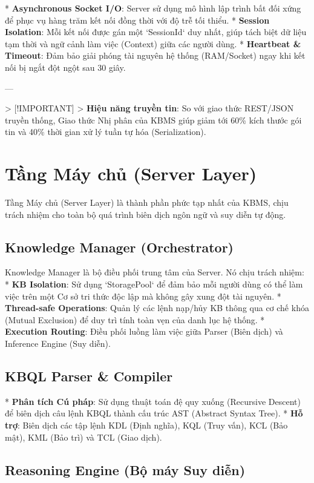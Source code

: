 *   \textbf{Asynchronous Socket I/O}: Server sử dụng mô hình lập trình bất đối xứng để phục vụ hàng trăm kết nối đồng thời với độ trễ tối thiểu.
*   \textbf{Session Isolation}: Mỗi kết nối được gán một `SessionId` duy nhất, giúp tách biệt dữ liệu tạm thời và ngữ cảnh làm việc (Context) giữa các người dùng.
*   \textbf{Heartbeat \& Timeout}: Đảm bảo giải phóng tài nguyên hệ thống (RAM/Socket) ngay khi kết nối bị ngắt đột ngột sau 30 giây.

---

> [!IMPORTANT]
> \textbf{Hiệu năng truyền tin}: So với giao thức REST/JSON truyền thống, Giao thức Nhị phân của KBMS giúp giảm tới 60\% kích thước gói tin và 40\% thời gian xử lý tuần tự hóa (Serialization).

\section{Tầng Máy chủ (Server Layer)}

Tầng Máy chủ (Server Layer) là thành phần phức tạp nhất của KBMS, chịu trách nhiệm cho toàn bộ quá trình biên dịch ngôn ngữ và suy diễn tự động.

\subsection{Knowledge Manager (Orchestrator)}

Knowledge Manager là bộ điều phối trung tâm của Server. Nó chịu trách nhiệm:
*   \textbf{KB Isolation}: Sử dụng `StoragePool` để đảm bảo mỗi người dùng có thể làm việc trên một Cơ sở tri thức độc lập mà không gây xung đột tài nguyên.
*   \textbf{Thread-safe Operations}: Quản lý các lệnh nạp/hủy KB thông qua cơ chế khóa (Mutual Exclusion) để duy trì tính toàn vẹn của danh lục hệ thống.
*   \textbf{Execution Routing}: Điều phối luồng làm việc giữa Parser (Biên dịch) và Inference Engine (Suy diễn).

\subsection{KBQL Parser & Compiler}

*   \textbf{Phân tích Cú pháp}: Sử dụng thuật toán đệ quy xuống (Recursive Descent) để biên dịch câu lệnh KBQL thành cấu trúc AST (Abstract Syntax Tree).
*   \textbf{Hỗ trợ}: Biên dịch các tập lệnh KDL (Định nghĩa), KQL (Truy vấn), KCL (Bảo mật), KML (Bảo trì) và TCL (Giao dịch).

\subsection{Reasoning Engine (Bộ máy Suy diễn)}

